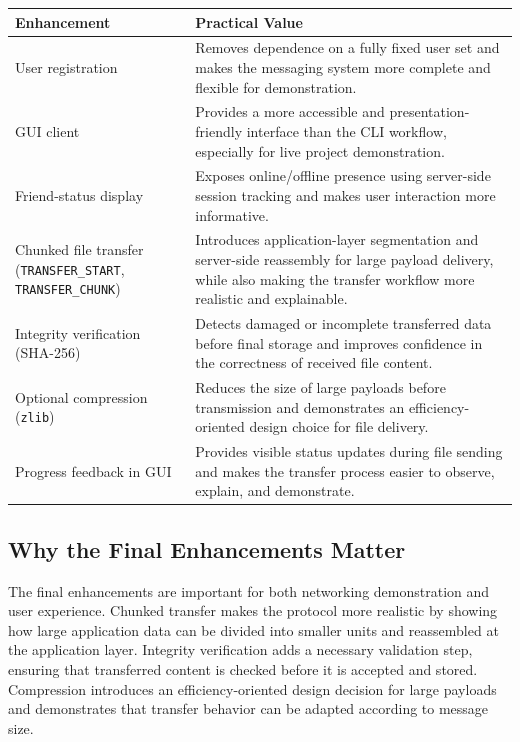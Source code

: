\documentclass[conference]{IEEEtran}
\begin{document}
\begin{center}
	\footnotesize
	\label{tab:enhancements}
	\renewcommand{\arraystretch}{1.15}
	\begin{tabularx}{\columnwidth}{
			>{\raggedright\arraybackslash}p{}
			>{\raggedright\arraybackslash}X
		}
		\toprule
		\textbf{Enhancement} & \textbf{Practical Value} \\
		\midrule
		
		User registration &
		Removes dependence on a fully fixed user set and makes the messaging system more complete and flexible for demonstration. \\
		
		GUI client &
		Provides a more accessible and presentation-friendly interface than the CLI workflow, especially for live project demonstration. \\
		
		Friend-status display &
		Exposes online/offline presence using server-side session tracking and makes user interaction more informative. \\
		
		Chunked file transfer (\texttt{TRANSFER\_START}, \texttt{TRANSFER\_CHUNK}) &
		Introduces application-layer segmentation and server-side reassembly for large payload delivery, while also making the transfer workflow more realistic and explainable. \\
		
		Integrity verification (SHA-256) &
		Detects damaged or incomplete transferred data before final storage and improves confidence in the correctness of received file content. \\
		
		Optional compression (\texttt{zlib}) &
		Reduces the size of large payloads before transmission and demonstrates an efficiency-oriented design choice for file delivery. \\
		
		Progress feedback in GUI &
		Provides visible status updates during file sending and makes the transfer process easier to observe, explain, and demonstrate. \\
		
		\bottomrule
	\end{tabularx}
\end{center}

\subsection{Why the Final Enhancements Matter}
The final enhancements are important for both networking demonstration and user experience. Chunked transfer makes the protocol more realistic by showing how large application data can be divided into smaller units and reassembled at the application layer. Integrity verification adds a necessary validation step, ensuring that transferred content is checked before it is accepted and stored. Compression introduces an efficiency-oriented design decision for large payloads and demonstrates that transfer behavior can be adapted according to message size.
\end{document}
